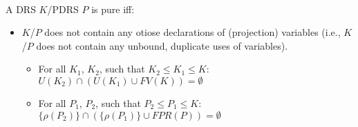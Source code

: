 \begin{definition}[Pureness]~\\
A DRS $K$/PDRS $P$ is pure iff:
\begin{itemize}
  \item $K$/$P$ does not contain any otiose declarations of (projection) variables
    (i.e., $K$/$P$ does not contain any unbound, duplicate uses of variables).
    \begin{itemize}
      \item For all $K_1$, $K_2$, such that $K_2 \leq K_1 \leq K$: 
        $U(K_2) \cap (U(K_1) \cup FV(K)) = \emptyset$
      \item For all $P_1$, $P_2$, such that $P_2 \leq P_1 \leq K$: 
        $\{\rho(P_2)\} \cap (\{\rho(P_1)\} \cup FPR(P)) = \emptyset$
    \end{itemize}
\end{itemize}
\end{definition}


